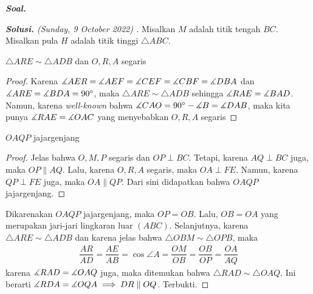 \textbf{\textit{Soal. }}

\begin{proof}[\textbf{Solusi.} (Sunday, 9 October 2022) ] 
Misalkan $M$ adalah titik tengah $BC$. Misalkan pula $H$ adalah titik tinggi $\triangle ABC$. 

\begin{lemmarev}
    $\triangle ARE \sim \triangle ADB$ dan $O,R,A$ segaris
    \begin{proof}
        Karena $\measuredangle AER = \measuredangle AEF = \measuredangle CEF = \measuredangle CBF = \measuredangle DBA$ dan $\measuredangle ARE = \measuredangle BDA = 90^\circ$, maka $\triangle ARE \sim \triangle ADB$ sehingga $\measuredangle RAE = \measuredangle BAD$. Namun, karena \textit{well-known} bahwa $\measuredangle CAO = 90^\circ - \measuredangle B = \measuredangle DAB$, maka kita punya $\measuredangle RAE = \measuredangle OAC$ yang menyebabkan $O,R,A$ segaris 
    \end{proof}
\end{lemmarev}
\begin{lemmarev}
    $OAQP$ jajargenjang
    \begin{proof}
        Jelas bahwa $O,M,P$ segaris dan $OP \perp BC$. Tetapi, karena $AQ \perp BC$ juga, maka $OP \parallel AQ$. Lalu, karena $O,R,A$ segaris, maka $OA \perp FE$. Namun, karena $QP \perp FE$ juga, maka $OA \parallel QP$. Dari sini didapatkan bahwa $OAQP$ jajargenjang.
    \end{proof}
\end{lemmarev}

Dikarenakan $OAQP$ jajargenjang, maka $OP=OB$. Lalu, $OB=OA$ yang merupakan jari-jari lingkaran luar $(ABC)$. Selanjutnya, karena $\triangle ARE \sim \triangle ADB$ dan karena jelas bahwa $\triangle OBM \sim \triangle OPB$, maka 
\begin{align*}
    \dfrac{AR}{AD} = \dfrac{AE}{AB} = \cos \angle A = \dfrac{OM}{OB} = \dfrac{OB}{OP} = \dfrac{OA}{AQ}
\end{align*}
karena $\measuredangle RAD = \measuredangle OAQ$ juga, maka ditemukan bahwa $\triangle RAD \sim \triangle OAQ$. Ini berarti $\measuredangle RDA = \measuredangle OQA \implies DR \parallel OQ$. Terbukti.


\end{proof}